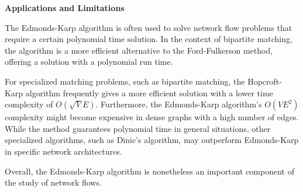 \textbf{Applications and Limitations}

The Edmonds-Karp algorithm is often used to solve network flow problems that require a certain polynomial time solution. In the context of bipartite matching, the algorithm is a more efficient alternative to the Ford-Fulkerson method, offering a solution with a polynomial run time.

For specialized matching problems, such as bipartite matching, the Hopcroft-Karp algorithm frequently gives a more efficient solution with a lower time complexity of \(O(\sqrt{V} E)\). Furthermore, the Edmonds-Karp algorithm's \(O(VE^2)\) complexity might become expensive in dense graphs with a high number of edges. While the method guarantees polynomial time in general situations, other specialized algorithms, such as Dinic's algorithm, may outperform Edmonds-Karp in specific network architectures.

Overall, the Edmonds-Karp algorithm is nonetheless an important component of the study of network flows.